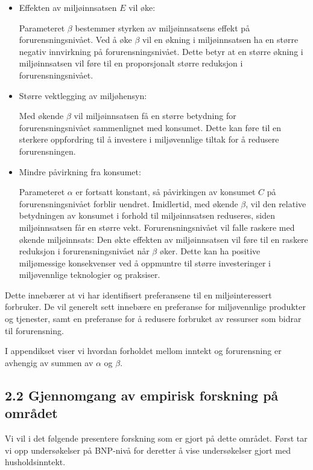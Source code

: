 \documentclass[
  12pt,
  letterpaper,
  DIV=11,
  numbers=noendperiod]{scrartcl}
\begin{document}
\begin{itemize}
\item
  Effekten av miljøinnsatsen \(E\) vil øke:

  Parameteret \(\beta\) bestemmer styrken av miljøinnsatsens effekt på
  forurensningsnivået. Ved å øke \(\beta\) vil en økning i
  miljøinnsatsen ha en større negativ innvirkning på
  forurensningsnivået. Dette betyr at en større økning i miljøinnsatsen
  vil føre til en proporsjonalt større reduksjon i forurensningsnivået.
\item
  Større vektlegging av miljøhensyn:

  Med økende \(\beta\) vil miljøinnsatsen få en større betydning for
  forurensningsnivået sammenlignet med konsumet. Dette kan føre til en
  sterkere oppfordring til å investere i miljøvennlige tiltak for å
  redusere forurensningen.
\item
  Mindre påvirkning fra konsumet:

  Parameteret \(\alpha\) er fortsatt konstant, så påvirkingen av
  konsumet \(C\) på forurensningsnivået forblir uendret. Imidlertid, med
  økende \(\beta\), vil den relative betydningen av konsumet i forhold
  til miljøinnsatsen reduseres, siden miljøinnsatsen får en større vekt.
  Forurensningsnivået vil falle raskere med økende miljøinnsats: Den
  økte effekten av miljøinnsatsen vil føre til en raskere reduksjon i
  forurensningsnivået når \(\beta\) øker. Dette kan ha positive
  miljømessige konsekvenser ved å oppmuntre til større investeringer i
  miljøvennlige teknologier og praksiser.
\end{itemize}

Dette innebærer at vi har identifisert preferansene til en
miljøinteressert forbruker. De vil generelt sett innebære en preferanse
for miljøvennlige produkter og tjenester, samt en preferanse for å
redusere forbruket av ressurser som bidrar til forurensning.

I appendikset viser vi hvordan forholdet mellom inntekt og forurensning
er avhengig av summen av \(\alpha\) og \(\beta\).

\hypertarget{gjennomgang-av-empirisk-forskning-puxe5-omruxe5det}{%
\subsection{2.2 Gjennomgang av empirisk forskning på
området}\label{gjennomgang-av-empirisk-forskning-puxe5-omruxe5det}}

Vi vil i det følgende presentere forskning som er gjort på dette
området. Først tar vi opp undersøkelser på BNP-nivå for deretter å vise
undersøkelser gjort med husholdsinntekt.
\end{document}
